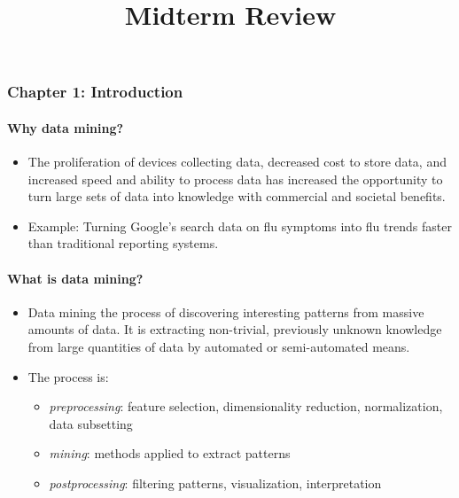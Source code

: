 \documentclass[11pt]{article}
\title{Midterm Review}
\providecommand{\tightlist}{%
      \setlength{\itemsep}{0pt}\setlength{\parskip}{0pt}}
\begin{document}
    
    
    \maketitle
    
    

    
    \subsubsection{Chapter 1: Introduction}\label{chapter-1-introduction}

    \paragraph{Why data mining?}\label{why-data-mining}

    \begin{itemize}
\item
  The proliferation of devices collecting data, decreased cost to store
  data, and increased speed and ability to process data has increased
  the opportunity to turn large sets of data into knowledge with
  commercial and societal benefits.
\item
  Example: Turning Google's search data on flu symptoms into flu trends
  faster than traditional reporting systems.
\end{itemize}

    \paragraph{What is data mining?}\label{what-is-data-mining}

    \begin{itemize}
\tightlist
\item
  Data mining the process of discovering interesting patterns from
  massive amounts of data. It is extracting non-trivial, previously
  unknown knowledge from large quantities of data by automated or
  semi-automated means.
\item
  The process is:

  \begin{itemize}
  \tightlist
  \item
    \emph{preprocessing}: feature selection, dimensionality reduction,
    normalization, data subsetting
  \item
    \emph{mining}: methods applied to extract patterns
  \item
    \emph{postprocessing}: filtering patterns, visualization,
    interpretation
  \end{itemize}
\end{itemize}
\end{document}
